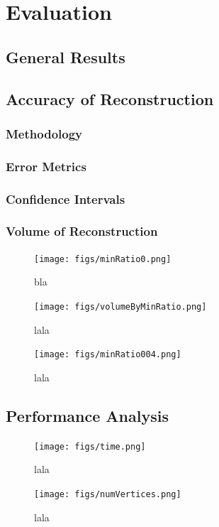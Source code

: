 \documentclass[12pt,a4paper,twoside,openright]{report}
\begin{document}
\chapter{Evaluation}
\section{General Results}

\section{Accuracy of Reconstruction}
\subsection{Methodology}
\subsection{Error Metrics}
\subsection{Confidence Intervals}
\subsection{Volume of Reconstruction}
\begin{figure}
\begin{center} 
\texttt{[image: figs/minRatio0.png]}	
\caption{bla}
\end{center}
\end{figure}

\begin{figure}
\begin{center}
\texttt{[image: figs/volumeByMinRatio.png]}	
\caption{lala}
\end{center}
\end{figure}

\begin{figure}
\begin{center}
\texttt{[image: figs/minRatio004.png]}	
\caption{lala}
\end{center}
\end{figure}

\section{Performance Analysis}
\begin{figure}
\begin{center}
\texttt{[image: figs/time.png]}	
\caption{lala}
\end{center}
\end{figure}
\begin{figure}
\begin{center}
\texttt{[image: figs/numVertices.png]}	
\caption{lala}
\end{center}
\end{figure}
\end{document}
